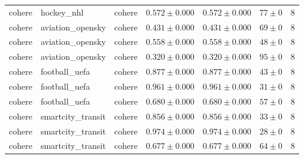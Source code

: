 \begin{table}[htbp]
\begin{tabular}{l l l r r r r}
cohere & hockey\_nhl & cohere & $0.572\pm0.000$ & $0.572\pm0.000$ & $77\pm0$ & 8 \\
cohere & aviation\_opensky & cohere & $0.431\pm0.000$ & $0.431\pm0.000$ & $69\pm0$ & 8 \\
cohere & aviation\_opensky & cohere & $0.558\pm0.000$ & $0.558\pm0.000$ & $48\pm0$ & 8 \\
cohere & aviation\_opensky & cohere & $0.320\pm0.000$ & $0.320\pm0.000$ & $95\pm0$ & 8 \\
cohere & football\_uefa & cohere & $0.877\pm0.000$ & $0.877\pm0.000$ & $43\pm0$ & 8 \\
cohere & football\_uefa & cohere & $0.961\pm0.000$ & $0.961\pm0.000$ & $31\pm0$ & 8 \\
cohere & football\_uefa & cohere & $0.680\pm0.000$ & $0.680\pm0.000$ & $57\pm0$ & 8 \\
cohere & smartcity\_transit & cohere & $0.856\pm0.000$ & $0.856\pm0.000$ & $33\pm0$ & 8 \\
cohere & smartcity\_transit & cohere & $0.974\pm0.000$ & $0.974\pm0.000$ & $28\pm0$ & 8 \\
cohere & smartcity\_transit & cohere & $0.677\pm0.000$ & $0.677\pm0.000$ & $64\pm0$ & 8 \\
\hline
\end{tabular}
\end{table}
